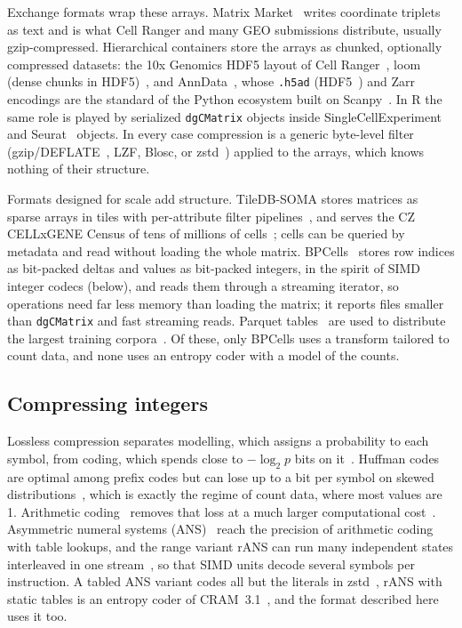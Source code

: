 Exchange formats wrap these arrays. Matrix Market~\cite{boisvert1997matrix} writes coordinate triplets as text and is
what Cell Ranger and many GEO submissions distribute, usually gzip-compressed. Hierarchical containers store the
arrays as chunked, optionally compressed datasets: the 10x Genomics HDF5 layout of Cell
Ranger~\cite{zheng2017massively,tenx_h5}, loom (dense chunks in HDF5)~\cite{loompy}, and AnnData~\cite{virshup2024anndata}, whose \texttt{.h5ad} (HDF5~\cite{hdf5}) and Zarr~\cite{zarr}
encodings are the standard of the Python ecosystem built on Scanpy~\cite{wolf2018scanpy}. In R the same role is
played by serialized \texttt{dgCMatrix} objects inside SingleCellExperiment~\cite{amezquita2020orchestrating} and
Seurat~\cite{hao2024dictionary} objects. In every case compression is a generic byte-level filter (gzip/DEFLATE~\cite{deutsch1996deflate},
LZF, Blosc, or zstd~\cite{collet2021zstd}) applied to the arrays, which knows nothing of their structure.

Formats designed for scale add structure. TileDB-SOMA stores matrices as sparse arrays in tiles with per-attribute
filter pipelines~\cite{papadopoulos2016tiledb,tiledbsoma}, and serves the CZ CELLxGENE Census of tens of millions of
cells~\cite{czi2025cellxgene}; cells can be queried by metadata and read without loading the whole matrix.
BPCells~\cite{parks2025bpcells} stores row indices as bit-packed deltas and values as bit-packed integers, in the spirit
of SIMD integer codecs (below), and reads them through a streaming iterator, so operations need far less memory than
loading the matrix; it reports files smaller than \texttt{dgCMatrix} and fast streaming reads. Parquet
tables~\cite{parquet} are used to distribute the largest training corpora~\cite{tahoe100m_hf}. Of these, only BPCells
uses a transform tailored to count data, and none uses an entropy coder with a model of the counts.

\subsection{Compressing integers}

Lossless compression separates modelling, which assigns a probability to each symbol, from coding, which spends close
to $-\log_2 p$ bits on it~\cite{shannon1948mathematical,cover2006elements}. Huffman codes~\cite{huffman1952method} are
optimal among prefix codes but can lose up to a bit per symbol on skewed distributions~\cite{cover2006elements}, which
is exactly the regime of count data, where most values are 1. Arithmetic
coding~\cite{rissanen1979arithmetic,witten1987arithmetic} removes that loss at a much larger computational
cost~\cite{duda2013asymmetric}. Asymmetric numeral systems (ANS)~\cite{duda2009asymmetric,duda2013asymmetric} reach the
precision of arithmetic coding with table lookups, and the range variant rANS can run many independent states
interleaved in one stream~\cite{giesen2014interleaved}, so that SIMD units decode several symbols per instruction. A
tabled ANS variant codes all but the literals in zstd~\cite{collet2021zstd}, rANS with static tables is an entropy
coder of CRAM~3.1~\cite{bonfield2022cram}, and the format described here uses it too.


